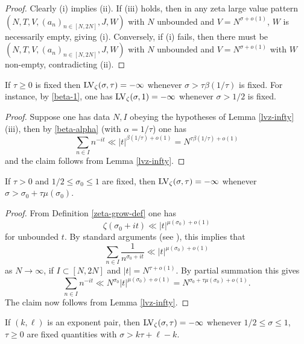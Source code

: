 \begin{proof} Clearly (i) implies (ii).
If (iii) holds, then in any zeta large value pattern
$(N,T,V,(a_n)_{n \in [N,2N]},J,W)$ with $N$ unbounded and $V = N^{\sigma+o(1)}$, $W$ is necessarily empty, giving (i). Conversely, if (i) fails, then there must be $(N,T,V,(a_n)_{n \in [N,2N]},J,W)$ with $N$ unbounded and $V = N^{\sigma+o(1)}$ with $W$ non-empty, contradicting (ii).
\end{proof}

\begin{corollary}\label{beta-zeta-vanish}  If $\tau \geq 0$ is fixed then $\mathrm{LV}_\zeta(\sigma,\tau) = -\infty$ whenever $\sigma > \tau \beta(1/\tau)$ is fixed. For instance, by \eqref{beta-1}, one has $\mathrm{LV}_\zeta(\sigma,1)=-\infty$ whenever $\sigma > 1/2$ is fixed.
\end{corollary}

\begin{proof} Suppose one has data $N, I$  obeying the hypotheses of Lemma \ref{lvz-infty}(iii), then by \eqref{beta-alpha} (with $\alpha = 1/\tau$) one has
$$ \sum_{n \in I} n^{-it} \ll |t|^{\beta(1/\tau)+o(1)} = N^{\tau \beta(1/\tau)+o(1)}$$
and the claim follows from Lemma \ref{lvz-infty}.
\end{proof}

\begin{corollary}\label{lvz-mu}  If $\tau > 0$ and $1/2 \leq \sigma_0 \leq 1$ are fixed, then $\mathrm{LV}_\zeta(\sigma,\tau) = -\infty$ whenever $\sigma > \sigma_0 + \tau \mu(\sigma_0)$.
\end{corollary}

\begin{proof} From Definition \ref{zeta-grow-def} one has
    $$ \zeta(\sigma_0 + it) \ll |t|^{\mu(\sigma_0) + o(1)}$$
    for unbounded $t$.  By standard arguments (see \cite[(8.13)]{ivic}), this implies that
    $$ \sum_{n \in I} \frac{1}{n^{\sigma_0+it}} \ll |t|^{\mu(\sigma_0) + o(1)}$$
as $N \to \infty$, if $I \subset [N,2N]$ and $|t| = N^{\tau+o(1)}$.  By partial summation this gives
$$ \sum_{n \in I} n^{-it} \ll N^{\sigma_0} |t|^{\mu(\sigma_0) + o(1)} = N^{\sigma_0 + \tau \mu(\sigma_0) + o(1)}.$$
The claim now follows from Lemma \ref{lvz-infty}.
\end{proof}

\begin{corollary}\label{lvz-exp} If $(k,\ell)$ is an exponent pair, then $\mathrm{LV}_\zeta(\sigma,\tau) = -\infty$ whenever $1/2 \leq \sigma \leq 1$, $\tau \geq 0$ are fixed quantities with $\sigma > k \tau + \ell - k$.
\end{corollary}

